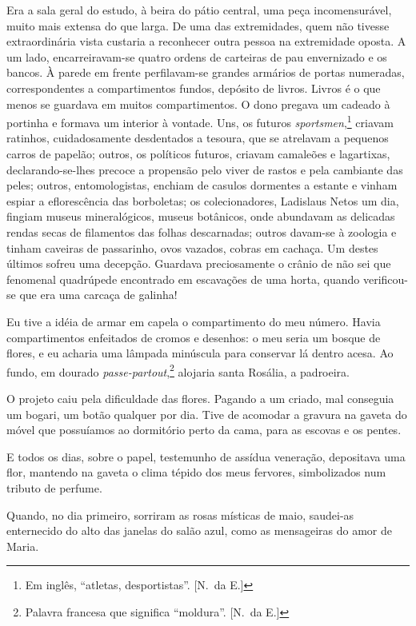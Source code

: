 Era a sala geral do estudo, à beira do pátio central, uma peça
incomensurável, muito mais extensa do que larga. De uma das
extremidades, quem não tivesse extraordinária vista custaria a
reconhecer outra pessoa na extremidade oposta. A um lado,
encarreiravam{}-se quatro ordens de carteiras de pau envernizado e os
bancos. À parede em frente perfilavam{}-se grandes armários de portas
numeradas, correspondentes a compartimentos fundos, depósito de livros.
Livros é o que menos se guardava em muitos compartimentos. O dono
pregava um cadeado à portinha e formava um interior à vontade. Uns, os
futuros \textit{sportsmen},\footnote{ Em inglês, ``atletas, desportistas''. 
[N.~da E.]} criavam ratinhos, cuidadosamente desdentados a
tesoura, que se atrelavam a pequenos carros de papelão; outros, os
políticos futuros, criavam camaleões e lagartixas,
declarando{}-se{}-lhes precoce a propensão pelo viver de rastos e pela
cambiante das peles; outros, entomologistas, enchiam de casulos
dormentes a estante e vinham espiar a eflorescência das borboletas; os
colecionadores, Ladislaus Netos um dia, fingiam museus mineralógicos,
museus botânicos, onde abundavam as delicadas rendas secas de
filamentos das folhas descarnadas; outros davam{}-se à zoologia e
tinham caveiras de passarinho, ovos vazados, cobras em cachaça. Um
destes últimos sofreu uma decepção. Guardava preciosamente o crânio de
não sei que fenomenal quadrúpede encontrado em escavações de uma horta,
quando verificou{}-se que era uma carcaça de galinha! 

Eu tive a idéia
de armar em capela o compartimento do meu número. Havia compartimentos
enfeitados de cromos e desenhos: o meu seria um bosque de flores, e eu
acharia uma lâmpada minúscula para conservar lá dentro acesa. Ao fundo,
em dourado \textit{passe{}-partout},\footnote{ Palavra francesa que significa 
``moldura''. [N.~da E.]} alojaria santa Rosália, a padroeira. 


O projeto caiu pela dificuldade das flores. Pagando a um criado, mal
conseguia um bogari, um botão qualquer por dia. Tive de acomodar a
gravura na gaveta do móvel que possuíamos ao dormitório perto da cama,
para as escovas e os pentes. 


E todos os dias, sobre o papel, testemunho
de assídua veneração, depositava uma flor, mantendo na gaveta o clima
tépido dos meus fervores, simbolizados num tributo de perfume. 

Quando, no dia primeiro, sorriram as rosas místicas de maio, saudei{}-as
enternecido do alto das janelas do salão azul, como as mensageiras do
amor de Maria. 

